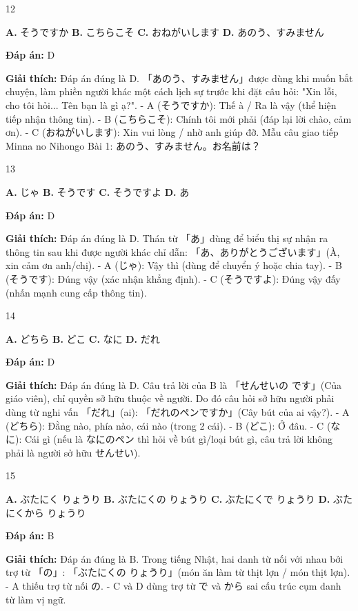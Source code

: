 \documentclass[12pt,a4paper]{report}
\newcommand{\source}[1]{}
\newcommand{\choice}[2]{\textbf{#1.} #2 \quad}
\newcommand{\answer}[1]{\par\textbf{Đáp án:} #1}
\newcommand{\confidence}[1]{}
\newcommand{\explain}[1]{\par\textbf{Giải thích:} #1\vspace{0.5cm}}
\begin{document}
\begin{question}{12}
\source{2.webp}
\choice{A}{そうですか}
\choice{B}{こちらこそ}
\choice{C}{おねがいします}
\choice{D}{あのう、すみません}
\answer{D}
\confidence{high}
\explain{Đáp án đúng là D. 「あのう、すみません」được dùng khi muốn bắt chuyện, làm phiền người khác một cách lịch sự trước khi đặt câu hỏi: "Xin lỗi, cho tôi hỏi... Tên bạn là gì ạ?".
- A (そうですか): Thế à / Ra là vậy (thể hiện tiếp nhận thông tin).
- B (こちらこそ): Chính tôi mới phải (đáp lại lời chào, cảm ơn).
- C (おねがいします): Xin vui lòng / nhờ anh giúp đỡ.
Mẫu câu giao tiếp Minna no Nihongo Bài 1: あのう、すみません。お名前は？}
\end{question}

\begin{question}{13}
\source{5.webp}
\choice{A}{じゃ}
\choice{B}{そうです}
\choice{C}{そうですよ}
\choice{D}{あ}
\answer{D}
\confidence{high}
\explain{Đáp án đúng là D. Thán từ 「あ」dùng để biểu thị sự nhận ra thông tin sau khi được người khác chỉ dẫn: 「あ、ありがとうございます」(À, xin cảm ơn anh/chị).
- A (じゃ): Vậy thì (dùng để chuyển ý hoặc chia tay).
- B (そうです): Đúng vậy (xác nhận khẳng định).
- C (そうですよ): Đúng vậy đấy (nhấn mạnh cung cấp thông tin).}
\end{question}

\begin{question}{14}
\source{7.webp}
\choice{A}{どちら}
\choice{B}{どこ}
\choice{C}{なに}
\choice{D}{だれ}
\answer{D}
\confidence{high}
\explain{Đáp án đúng là D. Câu trả lời của B là 「せんせいの です」(Của giáo viên), chỉ quyền sở hữu thuộc về người. Do đó câu hỏi sở hữu người phải dùng từ nghi vấn 「だれ」(ai): 「だれのペンですか」(Cây bút của ai vậy?).
- A (どちら): Đằng nào, phía nào, cái nào (trong 2 cái).
- B (どこ): Ở đâu.
- C (なに): Cái gì (nếu là なにのペン thì hỏi về bút gì/loại bút gì, câu trả lời không phải là người sở hữu せんせい).}
\end{question}

\begin{question}{15}
\source{15.webp}
\choice{A}{ぶたにく りょうり}
\choice{B}{ぶたにくの りょうり}
\choice{C}{ぶたにくで りょうり}
\choice{D}{ぶたにくから りょうり}
\answer{B}
\confidence{high}
\explain{Đáp án đúng là B. Trong tiếng Nhật, hai danh từ nối với nhau bởi trợ từ 「の」: 「ぶたにくの りょうり」(món ăn làm từ thịt lợn / món thịt lợn).
- A thiếu trợ từ nối の.
- C và D dùng trợ từ で và から sai cấu trúc cụm danh từ làm vị ngữ.}
\end{question}
\end{document}
